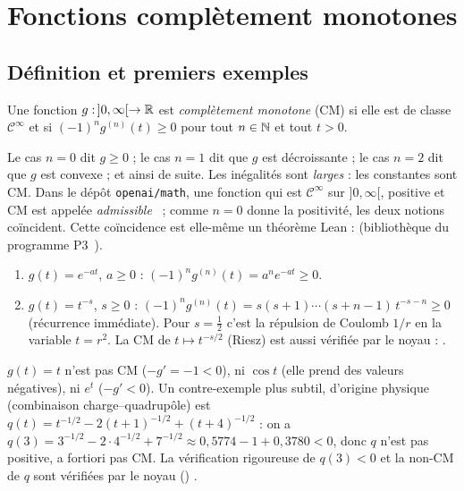 \section{Fonctions complètement monotones}
\label{ch1:sec:cm}

\subsection{Définition et premiers exemples}

\begin{definition}\label{ch1:def:cm}
Une fonction $g:\,]0,\infty[\to\mathbb{R}$ est \emph{complètement monotone} (CM) si elle est de classe $\mathcal C^\infty$ et si
$(-1)^n g^{(n)}(t)\ge0$ pour tout $n\in\mathbb{N}$ et tout $t>0$.
\end{definition}

Le cas $n=0$ dit $g\ge0$ ; le cas $n=1$ dit que $g$ est décroissante ; le cas $n=2$ dit que $g$ est convexe ; et ainsi de suite.
Les inégalités sont \emph{larges} : les constantes sont CM. Dans le dépôt \texttt{openai/math}, une fonction qui est $\mathcal C^\infty$ sur $]0,\infty[$,
positive et CM est appelée \emph{admissible}~\cite{oai} ; comme $n=0$ donne la positivité, les deux notions coïncident. Cette coïncidence est
elle-même un théorème Lean :  \tierA{} (bibliothèque du programme P3~\cite{p3}).

\begin{example}\label{ch1:ex:exemples}
\begin{enumerate}
\item $g(t)=e^{-at}$, $a\ge0$ : $(-1)^ng^{(n)}(t)=a^ne^{-at}\ge0$. \tierC{}
\item $g(t)=t^{-s}$, $s\ge0$ : $(-1)^ng^{(n)}(t)=s(s+1)\cdots(s+n-1)\,t^{-s-n}\ge0$ (récurrence immédiate). \tierC{}
Pour $s=\frac12$ c'est la répulsion de Coulomb $1/r$ en la variable $t=r^2$. La CM de $t\mapsto t^{-s/2}$ (Riesz) est aussi
vérifiée par le noyau :  \tierA{}.
\end{enumerate}
\end{example}

\begin{example}\label{ch1:ex:contre}
$g(t)=t$ n'est pas CM ($-g'=-1<0$), ni $\cos t$ (elle prend des valeurs négatives), ni $e^{t}$ ($-g'<0$).
Un contre-exemple plus subtil, d'origine physique (combinaison charge--quadrupôle) est
$q(t)=t^{-1/2}-2(t+1)^{-1/2}+(t+4)^{-1/2}$ : on a $q(3)=3^{-1/2}-2\cdot4^{-1/2}+7^{-1/2}\approx0{,}5774-1+0{,}3780<0$,
donc $q$ n'est pas positive, a fortiori pas CM. La vérification rigoureuse de $q(3)<0$ et la non-CM de $q$ sont vérifiées par le noyau
() \tierA{}.
\end{example}

